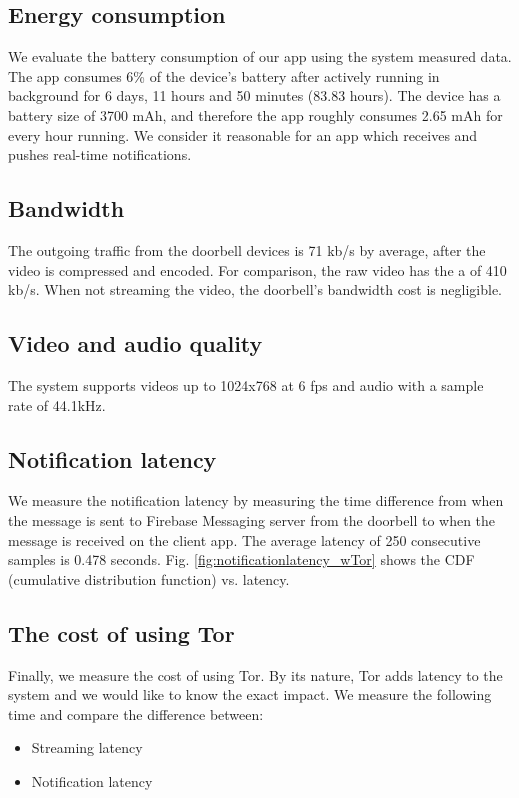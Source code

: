 \subsection{Energy consumption}
We evaluate the battery consumption of our app using the system measured data. The app consumes 6\% of the device's battery after actively running in background for 6 days, 11 hours and 50 minutes (83.83 hours). The device has a battery size of 3700 mAh, and therefore the app roughly consumes 2.65 mAh for every hour running. We consider it reasonable for an app which receives and pushes real-time notifications.

\subsection{Bandwidth}
The outgoing traffic from the doorbell devices is 71 kb/s by average, after the video is compressed and encoded. For comparison, the raw video has the a of 410 kb/s. When not streaming the video, the doorbell's bandwidth cost is negligible.

\subsection{Video and audio quality}
The system supports videos up to 1024x768 at 6 fps and audio with a sample rate of 44.1kHz.

\subsection{Notification latency}
\label{subsec:notification_latency}
We measure the notification latency by measuring the time difference from when the message is sent to Firebase Messaging server from the doorbell to when the message is received on the client app. The average latency of 250 consecutive samples is 0.478 seconds. Fig. \ref{fig:notificationlatency_wTor} shows the CDF (cumulative distribution function) vs. latency.

\subsection{The cost of using Tor}
Finally, we measure the cost of using Tor. By its nature, Tor adds latency to the system and we would like to know the exact impact. We measure the following time and compare the difference between:

\begin{itemize}
	\item Streaming latency
	\item Notification latency
\end{itemize}


